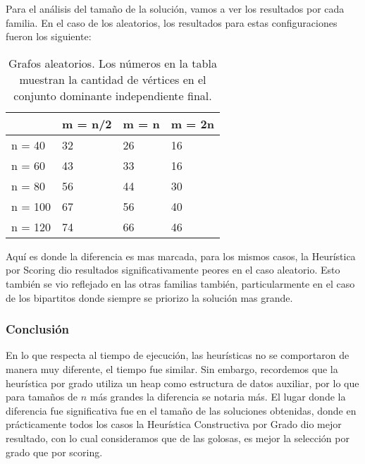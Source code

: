 Para el análisis del tamaño de la solución, vamos a ver los resultados por cada familia. En el caso de los aleatorios, los resultados para estas configuraciones fueron los siguiente:

\begin{table}[H]
\centering
\label{my-label}
\begin{tabular}{|l|lll|}
\hline
        & \multicolumn{1}{l|}{m = n/2} & \multicolumn{1}{l|}{m = n} & m = 2n \\ \hline
n = 40  & 32                           & 26                         & 16     \\ \cline{1-1}
n = 60  & 43                           & 33                         & 16     \\ \cline{1-1}
n = 80  & 56                           & 44                         & 30     \\ \cline{1-1}
n = 100 & 67                           & 56                         & 40     \\ \cline{1-1}
n = 120 & 74                           & 66                         & 46     \\ \hline
\end{tabular}
\caption{Grafos aleatorios. Los números en la tabla muestran la cantidad de vértices en el conjunto dominante independiente final.}
\end{table}

Aquí es donde la diferencia es mas marcada, para los mismos casos, la Heurística por Scoring dio resultados significativamente peores en el caso aleatorio. Esto también se vio reflejado en las otras familias también, particularmente en el caso de los bipartitos donde siempre se priorizo la solución mas grande.

\subsubsection{Conclusión}

En lo que respecta al tiempo de ejecución, las heurísticas no se comportaron de manera muy diferente, el tiempo fue similar. Sin embargo, recordemos que la heurística por grado utiliza un heap como estructura de datos auxiliar, por lo que para tamaños de $n$ más grandes la diferencia se notaria más. El lugar donde la diferencia fue significativa fue en el tamaño de las soluciones obtenidas, donde en prácticamente todos los casos la Heurística Constructiva por Grado dio mejor resultado, con lo cual consideramos que de las golosas, es mejor la selección por grado que por scoring.